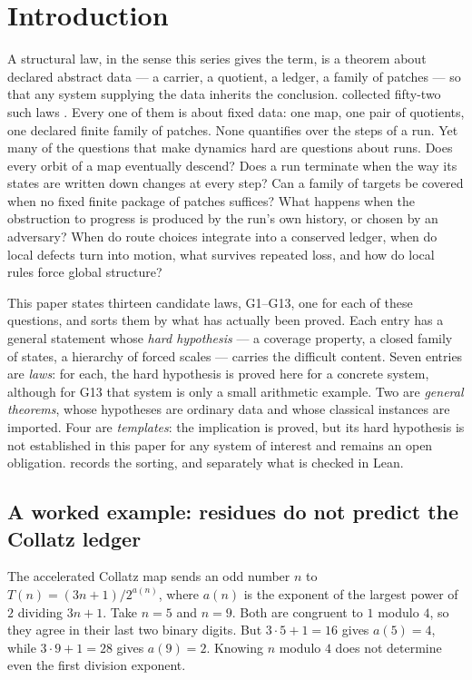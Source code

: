 \section{Introduction}\label{sec:intro}

A structural law, in the sense this series gives the term, is a theorem about declared abstract
data --- a carrier, a quotient, a ledger, a family of patches --- so that any system supplying the
data inherits the conclusion. \FoundIV{} collected fifty-two such laws
\citep{Tsiokos2026FoundIV}. Every one of them is about fixed data: one map, one pair of quotients,
one declared finite family of patches. None quantifies over the steps of a run. Yet many of the
questions that make dynamics hard are questions about runs. Does every orbit of a map eventually
descend? Does a run terminate when the way its states are written down changes at every step?
Can a family of targets be covered when no fixed finite package of patches suffices? What happens
when the obstruction to progress is produced by the run's own history, or chosen by an adversary?
When do route choices integrate into a conserved ledger, when do local defects turn into motion,
what survives repeated loss, and how do local rules force global structure?

This paper states thirteen candidate laws, G1--G13, one for each of these questions, and sorts
them by what has actually been proved. Each entry has a general statement whose \emph{hard
hypothesis} --- a coverage property, a closed family of states, a hierarchy of forced scales ---
carries the difficult content. Seven entries are \emph{laws}: for each, the hard hypothesis is
proved here for a concrete system, although for G13 that system is only a small arithmetic example.
Two are \emph{general theorems}, whose hypotheses are ordinary data and whose classical instances
are imported. Four are \emph{templates}: the implication is proved, but its hard hypothesis is not
established in this paper for any system of interest and remains an open obligation.  records the sorting, and
separately what is checked in Lean.

\subsection{A worked example: residues do not predict the Collatz ledger}\label{sec:intro-example}

The accelerated Collatz map sends an odd number $n$ to $T(n) = (3n+1)/2^{a(n)}$, where $a(n)$ is
the exponent of the largest power of $2$ dividing $3n+1$. Take $n = 5$ and $n = 9$. Both are
congruent to $1$ modulo $4$, so they agree in their last two binary digits. But $3\cdot 5 + 1 =
16$ gives $a(5) = 4$, while $3 \cdot 9 + 1 = 28$ gives $a(9) = 2$. Knowing $n$ modulo $4$ does not
determine even the first division exponent.

